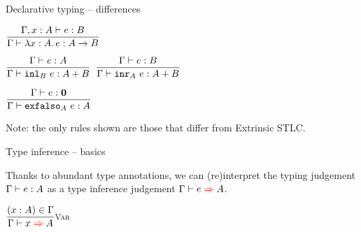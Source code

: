\documentclass{beamer}
\begin{document}
\begin{frame}{Declarative typing -- differences}

\begin{center}
  $\displaystyle \frac{\Gamma, x : A \vdash e : B}{\Gamma \vdash \lambda x : A.\, e : A \to B} \textsc{\footnotesize{}}$

  \vspace{2em}

  $\displaystyle \frac{\Gamma \vdash e : A}{\Gamma \vdash \texttt{inl}_{B}\ e : A + B} \textsc{\footnotesize{}}$ \quad
  $\displaystyle \frac{\Gamma \vdash e : B}{\Gamma \vdash \texttt{inr}_{A}\ e : A + B} \textsc{\footnotesize{}}$

  \vspace{2em}

  $\displaystyle \frac{\Gamma \vdash e : \textbf{0}}{\Gamma \vdash \texttt{exfalso}_{A}\ e : A} \textsc{\footnotesize{}}$
\end{center}

\vspace{2em}

Note: the only rules shown are those that differ from Extrinsic STLC.

\end{frame}

\begin{frame}{Type inference -- basics}

Thanks to abundant type annotations, we can (re)interpret the typing judgement $\Gamma \vdash e : A$ as a type inference judgement $\fullinfer{\Gamma}{e}{A}$.

\vspace{2em}

\begin{center}
  $\infrule[Var]{\sidecond{(x : A) \in \Gamma}}{\infer{x}{A}}$
\end{center}

\end{frame}
\end{document}

